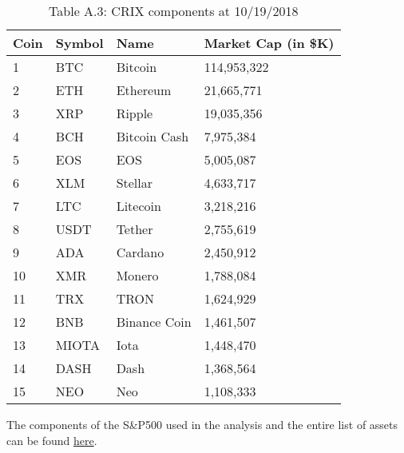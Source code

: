 \begin{table}[H]
	\centering
	\tiny{	\caption*{Table A.3: CRIX components at 10/19/2018}
		\begin{tabular}{llll} \hline\hline
			Coin & Symbol & Name & Market Cap (in \$K) \\ \hline
			1 & BTC & Bitcoin & 114,953,322 \\
			2 & ETH & Ethereum & 21,665,771 \\
			3 & XRP & Ripple & 19,035,356 \\
			4 & BCH & Bitcoin Cash & 7,975,384 \\
			5 & EOS & EOS & 5,005,087 \\
			6 & XLM & Stellar & 4,633,717 \\
			7 & LTC & Litecoin & 3,218,216 \\
			8 & USDT & Tether & 2,755,619 \\
			9 & ADA & Cardano & 2,450,912 \\
			10 & XMR & Monero & 1,788,084 \\
			11 & TRX & TRON & 1,624,929 \\
			12 & BNB & Binance Coin & 1,461,507 \\
			13 & MIOTA & Iota & 1,448,470 \\
			14 & DASH & Dash & 1,368,564 \\
			15 & NEO & Neo & 1,108,333 \\ \hline\hline
	\end{tabular}}

\end{table}


The components of the S\&P500 used in the analysis and the entire list of assets can be found \href{https://github.com/QuantLet/Genus_proximum_cryptos/blob/master/list.xlsx}{here}. 